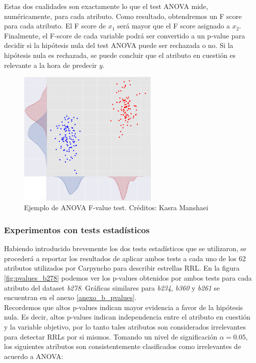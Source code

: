 Estas dos cualidades son exactamente lo que el test ANOVA mide, numéricamente, para cada atributo. Como resultado, obtendremos un F score para cada atributo. El F score de $x_1$ será mayor que el F score asignado a $x_2$. Finalmente, el F-score de cada variable podrá ser convertido a un p-value para decidir si la hipótesis nula del test ANOVA puede ser rechazada o no. Si la hipótesis nula es rechazada, se puede concluir que el atributo en cuestión es relevante a la hora de predecir $y$. 

\begin{figure}[h!]
\centering
  \includegraphics[width=0.6\textwidth]{Kap6/anova_example.png}
\caption{ Ejemplo de ANOVA F-value test. Créditos: Kasra Manshaei }
\label{fig:anova_example}
\end{figure}

\subsubsection{Experimentos con tests estadísticos}
\label{experimentos_test_estadisticos}
Habiendo introducido brevemente los dos tests estadísticos que se utilizaron, se procederá a reportar los resultados de aplicar ambos tests a cada uno de los 62 atributos utilizados por Carpyncho para describir estrellas RRL. En la figura \ref{fig:pvalues_b278} podemos ver los p-values obtenidos por ambos tests para cada atributo del dataset \textit{b278}. Gráficas similares para \textit{b234}, \textit{b360} y \textit{b261} se encuentran en el anexo \ref{anexo_b_pvalues}. \\

Recordemos que altos p-values indican mayor evidencia a favor de la hipótesis nula. Es decir, altos p-values indican independencia entre el atributo en cuestión y la variable objetivo, por lo tanto tales atributos son considerados irrelevantes para detectar RRLs por si mismos. Tomando un nivel de significación $\alpha=0.05$, los siguientes atributos son consistentemente clasificados como irrelevantes de acuerdo a ANOVA:


